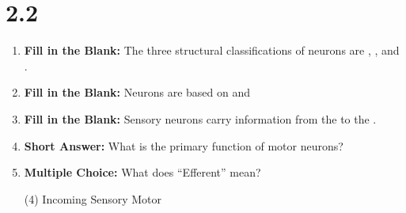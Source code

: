\section*{2.2}
\begin{enumerate}[label=\textbf{Q2.2.\arabic*}]

      \item \textbf{Fill in the Blank:} The three structural classifications of neurons are , , and . \\

      \item \textbf{Fill in the Blank:} Neurons are based on  and  \\

      \item \textbf{Fill in the Blank:} Sensory neurons carry information from the  to the . \\

      \item \textbf{Short Answer:} What is the primary function of motor neurons? \\

      \item \textbf{Multiple Choice:} What does ``Efferent'' mean?
            \begin{tasks}[label=\textcolor{draculafg}{(\Alph*)}, item-format=\color{draculafg}, label-width=1.5em, item-indent=1.7em](4)
                  \task Incoming
                  \task Sensory
                  \task Motor
                  \task {}
            \end{tasks}

\end{enumerate}
\squigglyline


